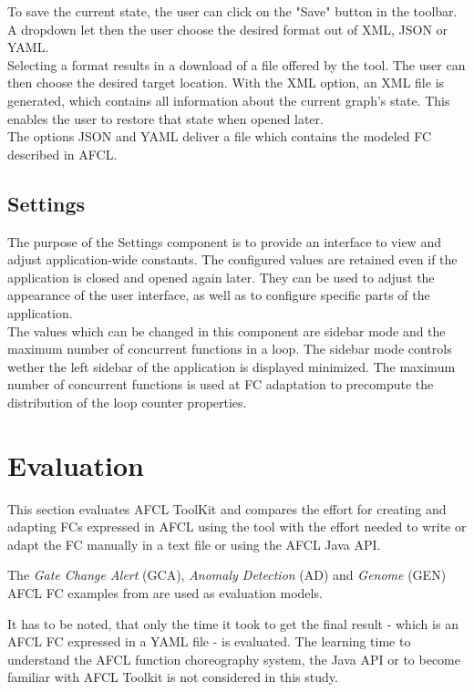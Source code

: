\documentclass[a4paper,top=25mm,bottom=25mm,12pt,pdftex,halfparskip,twoside,openany,bibtotoc,numbers=noenddot]{scrbook}
\begin{document}
To save the current state, the user can click on the "Save" button in the toolbar. A dropdown let then the user choose the desired format out of XML, JSON or YAML.\\
Selecting a format results in a download of a file offered by the tool. The user can then choose the desired target location.  
With the XML option, an XML file is generated, which contains all information about the current graph's state. This enables the user to restore that state when opened later.\\
The options JSON and YAML deliver a file which contains the modeled FC described in AFCL.

\section{Settings}

The purpose of the Settings component is to provide an interface to view and adjust application-wide constants. The configured values are retained even if the application is closed and opened again later. They can be used to adjust the appearance of the user interface, as well as to configure specific parts of the application.\\
The values which can be changed in this component are sidebar mode and the maximum number of concurrent functions in a loop. The sidebar mode controls wether the left sidebar of the application is displayed minimized. The maximum number of concurrent functions is used at FC adaptation to precompute the distribution of the loop counter properties.


\chapter{Evaluation}
\label{chap:evaluation}

This section evaluates AFCL ToolKit and compares the effort for creating and adapting FCs expressed in AFCL using the tool with the effort needed to write or adapt the FC manually in a text file or using the AFCL Java API.

The \textit{Gate Change Alert}  (GCA), \textit{Anomaly Detection} (AD) and \textit{Genome} (GEN) AFCL FC examples from \citep{online-afcl-dps} are used as evaluation models.

It has to be noted, that only the time it took to get the final result - which is an AFCL FC expressed in a YAML file - is evaluated.
The learning time to understand the AFCL function choreography system, the Java API or to become familiar with AFCL Toolkit is not considered in this study.
\end{document}
